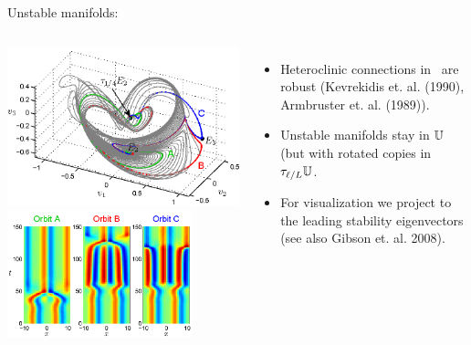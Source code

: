 \documentclass{beamer}
\begin{document}
\begin{frame}{Unstable manifolds: }
 \begin{columns}
	\includegraphics[width=\textwidth,height=0.6\textheight]{../../figs/ks22_E2_manifold_c}\\
	\includegraphics[width=0.8\textwidth,height=0.3\textheight]{../../figs/ks22_E2_orbits_c}		
 \begin{itemize}
  \item Heteroclinic connections in \KSe\ are robust (Kevrekidis et. al. (1990), Armbruster et. al. (1989)).
  \item Unstable manifolds stay in $\mathbb{U}$ (but with rotated copies in $\tau_{\ell/L}\mathbb{U}$.
  \item For visualization we project to the leading stability eigenvectors (see also Gibson et. al. 2008).
 \end{itemize}
 \end{columns}
	
\end{frame}
\end{document}
